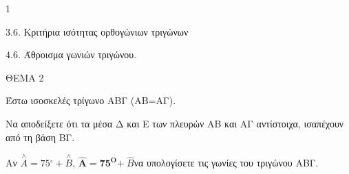 \begin{ylh}{1}
    \item 3.6. Κριτήρια ισότητας ορθογώνιων τριγώνων
    \item 4.6. Άθροισμα γωνιών τριγώνου.
\end{ylh}

ΘΕΜΑ 2

Έστω ισοσκελές τρίγωνο ΑΒΓ (ΑΒ=ΑΓ).

\begin{alist}
\item Να αποδείξετε ότι τα μέσα Δ και Ε των πλευρών ΑΒ και ΑΓ αντίστοιχα, ισαπέχουν από τη βάση ΒΓ. 

\item Αν $\overset{\land}{A} = 75{^\circ} + \overset{\land}{B}$, $\widehat{\mathbf{Α}}\mathbf{=}\mathbf{75}^{\mathbf{Ο}}\mathbf{+ \ }\widehat{Β}$να υπολογίσετε τις γωνίες του τριγώνου ΑΒΓ. 
\end{alist}

